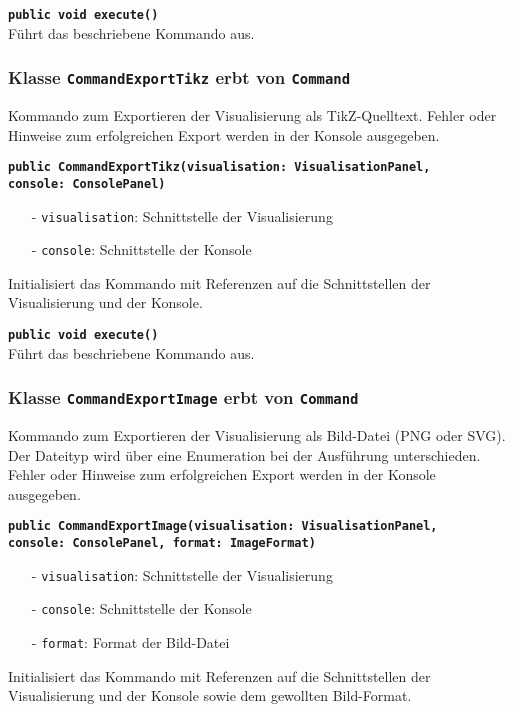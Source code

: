 \documentclass[parskip=full,11pt,twoside]{scrartcl}
\begin{document}
\textbf{\texttt{public void execute()}}\\
Führt das beschriebene Kommando aus.

\subsubsection{Klasse \texttt{CommandExportTikz} erbt von \texttt{Command}}
Kommando zum Exportieren der Visualisierung als TikZ-Quelltext. Fehler oder Hinweise zum erfolgreichen Export werden in der Konsole ausgegeben.

\textbf{\texttt{public CommandExportTikz(visualisation: VisualisationPanel,\\console: ConsolePanel)}}\\
\begin{itemize}[noitemsep]
	\item[-] \texttt{visualisation}: Schnittstelle der Visualisierung
	\item[-] \texttt{console}: Schnittstelle der Konsole
\end{itemize}
Initialisiert das Kommando mit Referenzen auf die Schnittstellen der Visualisierung und der Konsole.

\textbf{\texttt{public void execute()}}\\
Führt das beschriebene Kommando aus.

\subsubsection{Klasse \texttt{CommandExportImage} erbt von \texttt{Command}}
Kommando zum Exportieren der Visualisierung als Bild-Datei (PNG oder SVG). Der Dateityp wird über eine Enumeration bei der Ausführung unterschieden. Fehler oder Hinweise zum erfolgreichen Export werden in der Konsole ausgegeben.

\textbf{\texttt{public CommandExportImage(visualisation: VisualisationPanel,\\console: ConsolePanel, format: ImageFormat)}}\\
\begin{itemize}[noitemsep]
	\item[-] \texttt{visualisation}: Schnittstelle der Visualisierung
	\item[-] \texttt{console}: Schnittstelle der Konsole
	\item[-] \texttt{format}: Format der Bild-Datei
\end{itemize}
Initialisiert das Kommando mit Referenzen auf die Schnittstellen der Visualisierung und der Konsole sowie dem gewollten Bild-Format.
\end{document}
